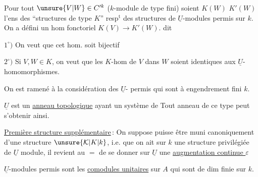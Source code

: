 Pour tout $\unsure{V|W}\in C'^{k}$ ($k$-module de type fini)
soient $K(W)$  $K'(W)$ l'ens des ``structures
de type $K$'' resp$^{\mathrm t}$ des structures de $\underline U$-modules
permis sur $k$. On a défini un hom
fonctoriel $K(V)\longrightarrow K'(W)$.  dit

$1^\circ)$ On veut que cet hom. soit bijectif

$2^\circ)$ Si $V,W\in K$, on veut que les
$K$-hom de $V$ dans $W$ soient identiques aux
$\underline U$-homomorphismes.

On est ramené à la considération des $\underline U$-
permis qui sont à engendrement fini  $k$.

$\underline U$ est un \uline{anneau topologique}  ayant un
système  de  
  Tout
anneau de ce type peut s'obtenir ainsi.

\uline{Première structure supplémentaire}\,: On suppose
  puisse être muni canoniquement
d'une structure $\unsure{\mathcal K|K|k}$, i.e. que on ait
sur $k$ une structure privilégiée de $\underline U$ module,
 il revient au $=$ de se donner sur
$\underline U$ une \uline{augmentation continue $\varepsilon$}

 $\underline U$-modules permis sont les \uline{comodules unitaires}
sur $A$  qui sont de dim finie sur $k$.

